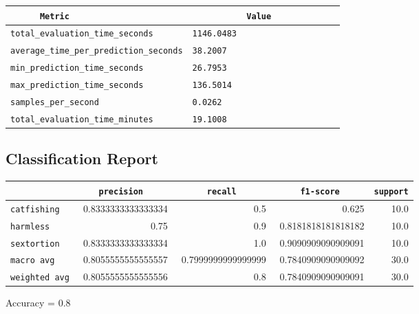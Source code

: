 \documentclass{article}
\begin{document}
\begin{center}
\begin{tabular}{l | l} \hline
    \verb|      Metric     | & \verb|           Value           | \\ \hline
    \hline
    \verb|total_evaluation_time_seconds| & \verb|1146.0483                    | \\ \hline
    \verb|average_time_per_prediction_seconds| & \verb|38.2007                      | \\ \hline
    \verb|min_prediction_time_seconds| & \verb|26.7953                      | \\ \hline
    \verb|max_prediction_time_seconds| & \verb|136.5014                     | \\ \hline
    \verb|samples_per_second| & \verb|0.0262                       | \\ \hline
    \verb|total_evaluation_time_minutes| & \verb|19.1008                      | \\ \hline
\end{tabular}
\end{center}

\subsection{Classification Report}

\begin{center}
\begin{tabular}{l | r | r | r | r} \hline
    \verb|            | & \verb|    precision     | & \verb|      recall      | & \verb|     f1-score     | & \verb|support| \\ \hline
    \hline
    \verb|catfishing | & 0.8333333333333334 & 0.5 & 0.625 &    10.0 \\ \hline
    \verb|harmless   | & 0.75 & 0.9 & 0.8181818181818182 &    10.0 \\ \hline
    \verb|sextortion | & 0.8333333333333334 & 1.0 & 0.9090909090909091 &    10.0 \\ \hline
    \verb|macro avg  | & 0.8055555555555557 & 0.7999999999999999 & 0.7840909090909092 &    30.0 \\ \hline
    \verb|weighted avg| & 0.8055555555555556 & 0.8 & 0.7840909090909091 &    30.0 \\ \hline
\end{tabular}
\end{center}

\begin{center}
Accuracy = 0.8
\end{center}
\end{document}
